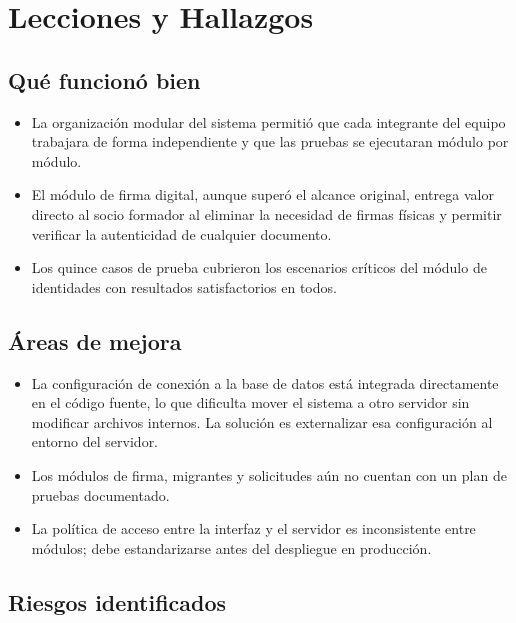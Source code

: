 \documentclass[10pt,letterpaper]{report}
\begin{document}
\chapter{Lecciones y Hallazgos}

\section{Qué funcionó bien}

\begin{itemize}[noitemsep]
  \item La organización modular del sistema permitió que cada integrante del equipo trabajara de forma independiente y que las pruebas se ejecutaran módulo por módulo.
  \item El módulo de firma digital, aunque superó el alcance original, entrega valor directo al socio formador al eliminar la necesidad de firmas físicas y permitir verificar la autenticidad de cualquier documento.
  \item Los quince casos de prueba cubrieron los escenarios críticos del módulo de identidades con resultados satisfactorios en todos.
\end{itemize}

\section{Áreas de mejora}

\begin{itemize}[noitemsep]
  \item La configuración de conexión a la base de datos está integrada directamente en el código fuente, lo que dificulta mover el sistema a otro servidor sin modificar archivos internos. La solución es externalizar esa configuración al entorno del servidor.
  \item Los módulos de firma, migrantes y solicitudes aún no cuentan con un plan de pruebas documentado.
  \item La política de acceso entre la interfaz y el servidor es inconsistente entre módulos; debe estandarizarse antes del despliegue en producción.
\end{itemize}

\section{Riesgos identificados}
\end{document}
